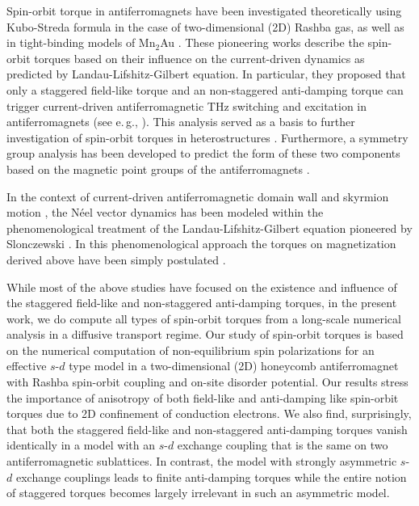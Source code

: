 Spin-orbit torque in antiferromagnets have been investigated theoretically using Kubo-Streda formula in the case of two-dimensional (2D) Rashba gas, as well as in tight-binding models of Mn$_2$Au \cite{zelezny_relativistic_2014, zelezny_spin-orbit_2017}. These pioneering works describe the spin-orbit torques based on their influence on the current-driven dynamics as predicted by Landau-Lifshitz-Gilbert equation. In particular, they proposed that only a staggered field-like torque and an non-staggered anti-damping torque can trigger current-driven antiferromagnetic THz switching and excitation in antiferromagnets (see e.\,g., \cite{fjaerbu_electrically_2017, cheng_terahertz_2016, khymyn_antiferromagnetic_2017}). This analysis served as a basis to further investigation of spin-orbit torques in heterostructures \cite{manchon_spin_2017, ghosh_spin-orbit_2017, ghosh_nonequilibrium_2019}. Furthermore, a symmetry group analysis has been developed to predict the form of these two components based on the magnetic point groups of the antiferromagnets \cite{zelezny_spin-orbit_2017, watanabe_symmetry_2018}. 
 
In the context of current-driven antiferromagnetic domain wall \cite{hals_phenomenology_2011} and skyrmion motion \cite{barker_static_2016, zhang_antiferromagnetic_2016}, the N\'eel vector dynamics has been modeled within the phenomenological treatment of the Landau-Lifshitz-Gilbert equation pioneered by Slonczewski \cite{slonczewski_current-driven_1996}. In this phenomenological approach the torques on magnetization derived above have been simply postulated \cite{gomonay_high_2016, shiino_antiferromagnetic_2016, akosa_theory_2018, tomasello_performance_2017}. 

While most of the above studies have focused on the existence and influence of the staggered field-like and non-staggered anti-damping torques, in the present work, we do compute all types of spin-orbit torques from a long-scale numerical analysis in a diffusive transport regime. Our study of spin-orbit torques is based on the numerical computation of non-equilibrium spin polarizations for an effective $s$-$d$ type model in a two-dimensional (2D) honeycomb antiferromagnet with Rashba spin-orbit coupling and on-site disorder potential.  Our results stress the importance of anisotropy of both field-like and anti-damping like spin-orbit torques due to 2D confinement of conduction electrons. We also find, surprisingly, that both the staggered field-like and non-staggered anti-damping torques vanish identically in a model with an $s$-$d$ exchange coupling that is the same on two antiferromagnetic sublattices. In contrast, the model with strongly asymmetric $s$-$d$ exchange couplings leads to finite anti-damping torques while the entire notion of staggered torques becomes largely irrelevant in such an asymmetric  model. 

